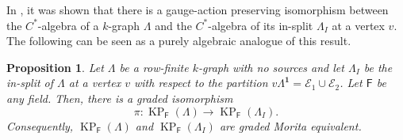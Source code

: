 \documentclass[12pt]{amsart}
\newcommand{\KP}{\operatorname{KP}}
\newtheorem{prop}[thm]{Proposition}
\theoremstyle{definition}
\theoremstyle{remark}
\begin{document}
In \cite[Theorem 3.9]{EFGGGP}, it was shown that there is a gauge-action preserving isomorphism between the $C^*$-algebra of a $k$-graph $\Lambda$ and the $C^*$-algebra of its in-split $\Lambda_I$ at a vertex $v$. The following can be seen as a purely algebraic analogue of this result. 
\begin{prop}\label{pro in-splitting gives graded isomorphic KP algebras}
Let $\Lambda$ be a row-finite $k$-graph with no sources and let $\Lambda_I$ be the in-split of $\Lambda$ at a vertex $v$ with respect to the partition $v\Lambda^\mathbf{1}=\mathcal{E}_1\cup \mathcal{E}_2$. Let $\mathsf{F}$ be any field. Then, there is a graded isomorphism 
\[
\pi:\KP_\mathsf{F}(\Lambda)\longrightarrow \KP_\mathsf{F}(\Lambda_I).
\] 
Consequently, $\KP_\mathsf{F}(\Lambda)$ and $\KP_\mathsf{F}(\Lambda_I)$ are graded Morita equivalent.  
\end{prop}
\end{document}
